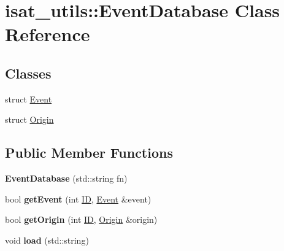 \hypertarget{classisat__utils_1_1_event_database}{}\section{isat\+\_\+utils\+:\+:Event\+Database Class Reference}
\label{classisat__utils_1_1_event_database}
\subsection*{Classes}
\begin{DoxyCompactItemize}
\item 
struct \hyperlink{structisat__utils_1_1_event_database_1_1_event}{Event}
\item 
struct \hyperlink{structisat__utils_1_1_event_database_1_1_origin}{Origin}
\end{DoxyCompactItemize}
\subsection*{Public Member Functions}
\begin{DoxyCompactItemize}
\item 
{\bfseries Event\+Database} (std\+::string fn)\hypertarget{classisat__utils_1_1_event_database_a95e4339f0ada0594c15230daa2f390b6}{}\label{classisat__utils_1_1_event_database_a95e4339f0ada0594c15230daa2f390b6}

\item 
bool {\bfseries get\+Event} (int \hyperlink{struct_i_d}{ID}, \hyperlink{structisat__utils_1_1_event_database_1_1_event}{Event} \&event)\hypertarget{classisat__utils_1_1_event_database_ad8ec2a4837e06de362660317d13937d1}{}\label{classisat__utils_1_1_event_database_ad8ec2a4837e06de362660317d13937d1}

\item 
bool {\bfseries get\+Origin} (int \hyperlink{struct_i_d}{ID}, \hyperlink{structisat__utils_1_1_event_database_1_1_origin}{Origin} \&origin)\hypertarget{classisat__utils_1_1_event_database_ad279b48748c3b7edbfb273676e41ab83}{}\label{classisat__utils_1_1_event_database_ad279b48748c3b7edbfb273676e41ab83}

\item 
void {\bfseries load} (std\+::string)\hypertarget{classisat__utils_1_1_event_database_a9c0a42de9196cabca75f9196a0ebdf08}{}\label{classisat__utils_1_1_event_database_a9c0a42de9196cabca75f9196a0ebdf08}

\end{DoxyCompactItemize}
